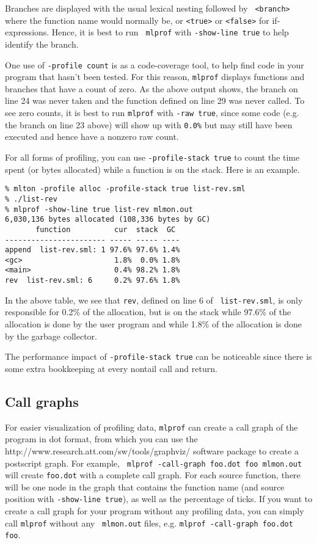 Branches are displayed with the usual lexical nesting followed by {\tt
<branch>} where the function name would normally be, or {\tt <true>}
or {\tt <false>} for if-expressions.  Hence, it is best to run {\tt
mlprof} with {\tt -show-line true} to help identify the branch.

One use of {\tt -profile count} is as a code-coverage tool, to help
find code in your program that hasn't been tested.  For this reason,
{\tt mlprof} displays functions and branches that have a count of
zero.  As the above output shows, the branch on line 24 was never
taken and the function defined on line 29 was never called.  To see
zero counts, it is best to run {\tt mlprof} with {\tt -raw true},
since some code (e.g. the branch on line 23 above) will show up with
{\tt 0.0\%} but may still have been executed and hence have a nonzero
raw count.
%

For all forms of profiling, you can use {\tt -profile-stack true} to
count the time spent (or bytes allocated) while a function is on the
stack.  Here is an example.

\begin{verbatim}
% mlton -profile alloc -profile-stack true list-rev.sml
% ./list-rev
% mlprof -show-line true list-rev mlmon.out
6,030,136 bytes allocated (108,336 bytes by GC)
       function          cur  stack  GC 
----------------------- ----- ----- ----
append  list-rev.sml: 1 97.6% 97.6% 1.4%
<gc>                     1.8%  0.0% 1.8%
<main>                   0.4% 98.2% 1.8%
rev  list-rev.sml: 6     0.2% 97.6% 1.8%
\end{verbatim}
%
In the above table, we see that {\tt rev}, defined on line 6 of {\tt
list-rev.sml}, is only responsible for 0.2\% of the allocation, but is
on the stack while 97.6\% of the allocation is done by the user
program and while 1.8\% of the allocation is done by the garbage
collector.

The performance impact of {\tt -profile-stack true} can be noticeable
since there is some extra bookkeeping at every nontail call and
return.
%
\subsection{Call graphs}

For easier visualization of profiling data, {\tt mlprof} can create a
call graph of the program in dot format, from which you can use the
		  {http://www.research.att.com/sw/tools/graphviz/}
software package to create a postscript graph.  For example, {\tt
mlprof -call-graph foo.dot foo mlmon.out} will create {\tt foo.dot}
with a complete call graph.  For each source function, there will be
one node in the graph that contains the function name (and source
position with {\tt -show-line true}), as well as the percentage of
ticks.  If you want to create a call graph for your program without
any profiling data, you can simply call {\tt mlprof} without any {\tt
mlmon.out} files, e.g. {\tt mlprof -call-graph foo.dot foo}.

